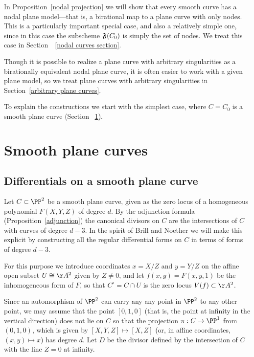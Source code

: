In Proposition~\ref{nodal projection}  we will show that every smooth curve has a nodal plane model---that is,
a birational map to a plane curve with only nodes. This is a particularly
important special case, and also a relatively simple one, since in this case the subscheme $\adj(C_{0})$
is simply the set of nodes.
We treat this case in Section~~\ref{nodal curves section}. 

Though it is possible to realize a plane curve with arbitrary singularities as a birationally
equivalent nodal plane curve, it is often easier to work with a given plane model, so we treat
plane curves with arbitrary singularities in Section~\ref{arbitrary plane curves}. 

To explain the constructions  we start with the simplest case, where $C = C_0$ is a smooth plane curve (Section~ \ref{smooth plane curves}).  

\section{Smooth plane curves}\label{smooth plane curves}

\subsection{Differentials on a smooth plane curve}\label{canonical series on smooth plane curves}

Let $C \subset \PP^2$  be a smooth plane curve, given as the zero locus of a homogeneous polynomial $F(X,Y,Z)$ of degree $d$. By the adjunction formula (Proposition~\ref{adjunction}) the canonical  divisors on $C$
are the intersections of $C$ with curves of degree $d-3$. In the spirit of Brill and Noether we
will make this explicit by constructing all
 the regular differential forms on $C$ in terms of forms of degree $d-3$.


For this purpose we introduce coordinates $x = X/Z$ and $y = Y/Z$ on the affine open subset $U \cong \AA^2$ given by $Z \neq 0$, and let $f(x,y) = F(x, y,1)$ be the inhomogeneous form of $F$, so that $C^\circ = C \cap U$ is the zero locus $V(f) \subset  \AA^2$. 

Since an automorphism of $\PP^2$ can carry any  any point in $\PP^{2}$ to any other point, we may assume
that 
 the point $[0,1,0]$ (that is, the point at infinity in the vertical direction) does not lie on $C$ so that the
 projection  $\pi: C \to \PP^1$ from $(0,1,0)$, which is given by $[X,Y,Z] \mapsto [X,Z]$ (or, in affine coordinates, $(x,y) \mapsto x$)  has degree $d$. Let $D$ be the divisor defined by the intersection of $C$ with the line $Z=0$ at infinity.

